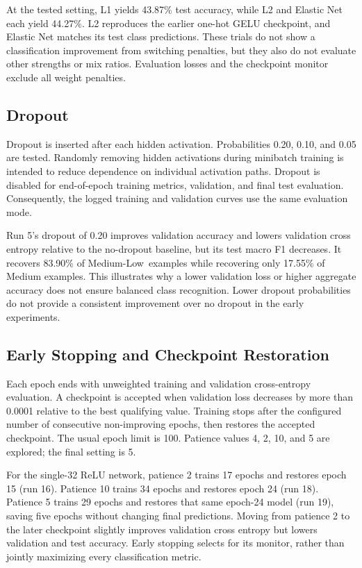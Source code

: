 \documentclass[11pt,letterpaper]{article}
\newcommand{\ML}{Medium-Low}
\begin{document}
At the tested setting, L1 yields 43.87\% test accuracy, while L2 and Elastic Net each yield 44.27\%. L2 reproduces the earlier one-hot GELU checkpoint, and Elastic Net matches its test class predictions. These trials do not show a classification improvement from switching penalties, but they also do not evaluate other strengths or mix ratios. Evaluation losses and the checkpoint monitor exclude all weight penalties.

\subsection{Dropout}
Dropout is inserted after each hidden activation. Probabilities 0.20, 0.10, and 0.05 are tested. Randomly removing hidden activations during minibatch training is intended to reduce dependence on individual activation paths. Dropout is disabled for end-of-epoch training metrics, validation, and final test evaluation. Consequently, the logged training and validation curves use the same evaluation mode.

Run 5's dropout of 0.20 improves validation accuracy and lowers validation cross entropy relative to the no-dropout baseline, but its test macro F1 decreases. It recovers 83.90\% of \ML\ examples while recovering only 17.55\% of Medium examples. This illustrates why a lower validation loss or higher aggregate accuracy does not ensure balanced class recognition. Lower dropout probabilities do not provide a consistent improvement over no dropout in the early experiments.

\subsection{Early Stopping and Checkpoint Restoration}
Each epoch ends with unweighted training and validation cross-entropy evaluation. A checkpoint is accepted when validation loss decreases by more than 0.0001 relative to the best qualifying value. Training stops after the configured number of consecutive non-improving epochs, then restores the accepted checkpoint. The usual epoch limit is 100. Patience values 4, 2, 10, and 5 are explored; the final setting is 5.

For the single-32 ReLU network, patience 2 trains 17 epochs and restores epoch 15 (run 16). Patience 10 trains 34 epochs and restores epoch 24 (run 18). Patience 5 trains 29 epochs and restores that same epoch-24 model (run 19), saving five epochs without changing final predictions. Moving from patience 2 to the later checkpoint slightly improves validation cross entropy but lowers validation and test accuracy. Early stopping selects for its monitor, rather than jointly maximizing every classification metric.
\end{document}
